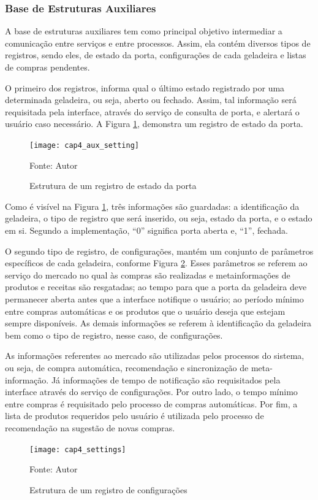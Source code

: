 \subsubsection{Base de Estruturas Auxiliares}

A base de estruturas auxiliares tem como principal objetivo intermediar a comunicação entre serviços e entre processos. Assim, ela contém diversos tipos de registros, sendo eles, de estado da porta, configurações de cada geladeira e listas de compras pendentes.

O primeiro dos registros, informa qual o último estado registrado por uma determinada geladeira, ou seja, aberto ou fechado. Assim, tal informação será requisitada pela interface, através do serviço de consulta de porta, e alertará o usuário caso necessário. A Figura \ref{fig:cap4_aux_setting}, demonstra um registro de estado da porta.

\begin{figure}[htb]
    \caption{Estrutura de um registro de estado da porta}
    \label{fig:cap4_aux_setting}
    \texttt{[image: cap4\_aux\_setting]}
    
    Fonte: Autor
\end{figure}

Como é visível na Figura \ref{fig:cap4_aux_setting}, três informações são guardadas: a identificação da geladeira, o tipo de registro que será inserido, ou seja, estado da porta, e o estado em si. Segundo a implementação, ``0'' significa porta aberta e, ``1'', fechada.

O segundo tipo de registro, de configurações, mantém um conjunto de parâmetros específicos de cada geladeira, conforme Figura \ref{fig:cap4_settings}. Esses parâmetros se referem ao serviço do mercado no qual às compras são realizadas e metainformações de produtos e receitas são resgatadas; ao tempo para que a porta da geladeira deve permanecer aberta antes que a interface notifique o usuário; ao período mínimo entre compras automáticas e os produtos que o usuário deseja que estejam sempre disponíveis. As demais informações se referem à identificação da geladeira bem como o tipo de registro, nesse caso, de configurações.

As informações referentes ao mercado são utilizadas pelos processos do sistema, ou seja, de compra automática, recomendação e sincronização de meta-informação. Já informações de tempo de notificação são requisitados pela interface através do serviço de configurações. Por outro lado, o tempo mínimo entre compras é requisitado pelo processo de compras automáticas. Por fim, a lista de produtos requeridos pelo usuário é utilizada pelo processo de recomendação na sugestão de novas compras.
\begin{figure}[htb]
    \caption{Estrutura de um registro de configurações}
    \label{fig:cap4_settings}
    \texttt{[image: cap4\_settings]}
     
    Fonte: Autor
\end{figure}

